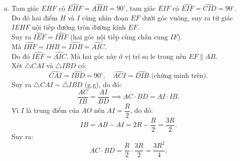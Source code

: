\begin{bt}
{\begin{enumerate}[a)]
	Hai đỉnh $A$ và $H$ kề nhau cùng nhìn đoạn $CI$ dưới góc $90^\circ$, suy ra tứ giác $ACHI$ nội tiếp đường tròn đường kính $CI$.\\
	Chứng minh tương tự: Vì $By \perp AB$ nên $\widehat{DBI} = 90^\circ$; và $\widehat{DHI} = 90^\circ$, do đó tứ giác $BDIH$ nội tiếp đường tròn đường kính $DI$.\\
	Từ tứ giác $ACHI$ nội tiếp, ta có $\widehat{AHI} = \widehat{ACI}$ (hai góc nội tiếp cùng chắn cung $AI$).\\
	Từ tứ giác $BDIH$ nội tiếp, ta có $\widehat{IHB} = \widehat{IDB}$ (hai góc nội tiếp cùng chắn cung $IB$).\\
	Do đó:
	$$\widehat{AHB} = \widehat{AHI} + \widehat{IHB} = \widehat{ACI} + \widehat{IDB}.$$
	Mặt khác, trong tam giác $CAI$ vuông tại $A$, ta có $\widehat{ACI} + \widehat{AIC} = 90^\circ$.\\
	Lại có $\widehat{AIC} + \widehat{CID} + \widehat{DIB} = 180^\circ \implies \widehat{AIC} + \widehat{DIB} = 180^\circ - 90^\circ = 90^\circ$.\\
	Suy ra $\widehat{ACI} = \widehat{DIB}$ (cùng phụ với $\widehat{AIC}$).\\
	Trong tam giác $DBI$ vuông tại $B$, ta có $\widehat{DIB} + \widehat{IDB} = 90^\circ \implies \widehat{ACI} + \widehat{IDB} = 90^\circ$.\\
	Vậy $\widehat{AHB} = 90^\circ$.
	\item Tam giác $EHF$ có $\widehat{EHF} = \widehat{AHB} = 90^\circ$, tam giác $EIF$ có $\widehat{EIF} = \widehat{CID} = 90^\circ$.\\
	Do đó hai điểm $H$ và $I$ cùng nhìn đoạn $EF$ dưới góc vuông, suy ra tứ giác $IEHF$ nội tiếp đường tròn đường kính $EF$.\\
	Suy ra $\widehat{IEF} = \widehat{IHF}$ (hai góc nội tiếp cùng chắn cung $IF$).\\
	Mà $\widehat{IHF} = \widehat{IHB} = \widehat{IDB} = \widehat{AIC}$.\\
	Do đó $\widehat{IEF} = \widehat{AIC}$. Mà hai góc này ở vị trí so le trong nên $EF \parallel AB$.\\
	Xét $\triangle CAI$ và $\triangle IBD$ có:
	$$\widehat{CAI} = \widehat{IBD} = 90^\circ,\quad \widehat{ACI} = \widehat{DIB}\text{ (chứng minh trên)}.$$
	Suy ra $\triangle CAI \sim \triangle IBD$ (g.g), do đó:
	$$\dfrac{AC}{IB} = \dfrac{AI}{BD} \implies AC \cdot BD = AI \cdot IB.$$
	Vì $I$ là trung điểm của $AO$ nên $AI = \dfrac{R}{2}$, do đó:
	$$IB = AB - AI = 2R - \dfrac{R}{2} = \dfrac{3R}{2}.$$
	Suy ra:
	$$AC \cdot BD = \dfrac{R}{2} \cdot \dfrac{3R}{2} = \dfrac{3R^2}{4}.$$

\end{enumerate}}
\end{bt}
